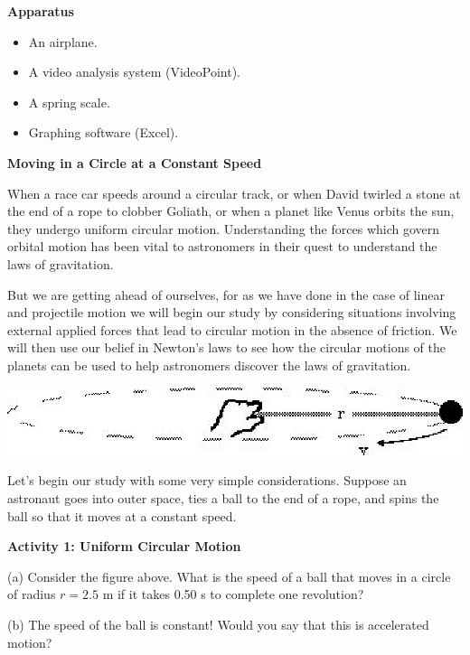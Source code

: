 \textbf{Apparatus}

\begin{itemize}
\item An airplane. 
\item A video analysis system (VideoPoint). 
\item A spring scale. 
\item Graphing software (Excel). 
\end{itemize}
\textbf{Moving in a Circle at a Constant Speed }

When a race car speeds around a circular track, or when David twirled a stone
at the end of a rope to clobber Goliath, or when a planet like Venus orbits
the sun, they undergo uniform circular motion. Understanding the forces which
govern orbital motion has been vital to astronomers in their quest to understand
the laws of gravitation. 

But we are getting ahead of ourselves, for as we have done in the case of linear
and projectile motion we will begin our study by considering situations involving
external applied forces that lead to circular motion in the absence of friction.
We will then use our belief in Newton's laws to see how the circular motions
of the planets can be used to help astronomers discover the laws of gravitation.

\vspace{0.3cm}
{\par\centering \includegraphics{centripetal_fig2.eps} \par}
\vspace{0.3cm}

Let's begin our study with some very simple considerations. Suppose an astronaut
goes into outer space, ties a ball to the end of a rope, and spins the ball
so that it moves at a constant speed.

\textbf{Activity 1: Uniform Circular Motion }

(a) Consider the figure above. What is the speed of a ball that moves in a circle
of radius $r = 2.5$ m if it takes 0.50 s to complete one revolution?
\vspace{20mm}

(b) The speed of the ball is constant! Would you say that this is accelerated
motion?
\vspace{20mm}

